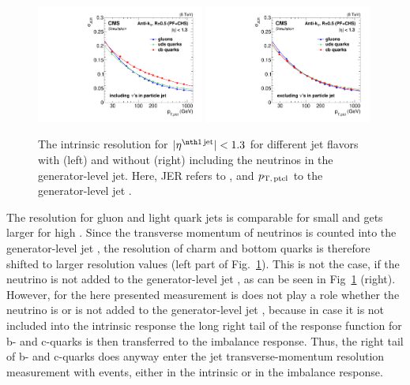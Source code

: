 \begin{figure}[b]
  \centering
      \includegraphics[width=0.49\textwidth]{figures/resolution/systematicUncertainties/Figure_38_withNu_Teresa_updated_4.pdf}
      \includegraphics[width=0.49\textwidth]{figures/resolution/systematicUncertainties/Figure_38_noNu_Teresa_updated_4.pdf}
  \caption{The intrinsic resolution \jerintr for $|\etafirstjet| < 1.3$ for different jet flavors with (left) and without (right) including the neutrinos in the generator-level jet.
           Here, JER refers to \jerintr, and $p_{\text{T,\,ptcl}}$ to the generator-level jet \pt. }  
  \label{res:fig:ResolutionDifferences}
\end{figure}
The resolution for gluon and light quark jets is comparable for small \ptgamma and gets larger for high \ptgamma.
Since the transverse momentum of neutrinos is counted into the generator-level jet \pt, the resolution of charm and bottom quarks is therefore shifted to larger resolution values (left part of Fig.~\ref{res:fig:ResolutionDifferences}).
This is not the case, if the neutrino \pt is not added to the generator-level jet \pt, as can be seen in Fig~\ref{res:fig:ResolutionDifferences} (right).
However, for the here presented measurement is does not play a role whether the neutrino \pt is or is not added to the generator-level jet \pt, because in case it is not included into the intrinsic response the long right tail of the response function for b- and c-quarks is then transferred to the imbalance response.
Thus, the right tail of b- and c-quarks does anyway enter the jet transverse-momentum resolution measurement with \GAMJET events, either in the intrinsic or in the imbalance response.

